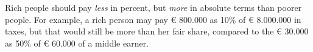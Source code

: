 Rich people should pay \emph{less} in percent, but \emph{more} in absolute terms than poorer people.
For example, a rich person may pay € 800.000 as 10\% of € 8.000.000 in taxes, but that would still be more than her fair share, compared to the € 30.000 as 50\% of € 60.000 of a middle earner.

